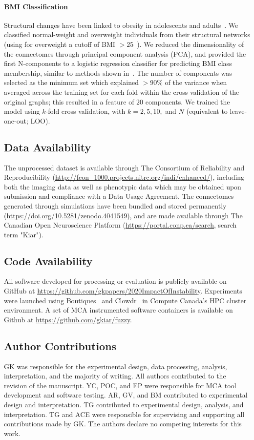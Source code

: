 \documentclass[fleqn,10pt]{SelfArx} %
\begin{document}
\paragraph{BMI Classification} Structural changes have been linked to obesity in adolescents and
adults~\cite{Raji2010-lh}. We classified normal-weight and overweight individuals from their structural networks (using
for overweight a cutoff of BMI $> 25$~\cite{Gupta2015-ap}). We reduced the dimensionality of the connectomes through
principal component analysis (PCA), and provided the first N-components to a logistic regression classifier for
predicting BMI class membership, similar to methods shown in~\cite{Gupta2015-ap,Park2015-uj}. The number of components
was selected as the minimum set which explained $> 90\%$ of the variance when averaged across the training set for each
fold within the cross validation of the original graphs; this resulted in a feature of $20$ components. We trained the
model using $k$-fold cross validation, with $k = 2, 5, 10,$ and $N$ (equivalent to leave-one-out; LOO).

\subsection*{Data Availability}
The unprocessed dataset is available through The Consortium of Reliability and Reproducibility
(\url{http://fcon_1000.projects.nitrc.org/indi/enhanced/}), including both the imaging data as well as phenotypic data
which may be obtained upon submission and compliance with a Data Usage Agreement. The connectomes generated through
simulations have been bundled and stored permanently (\url{https://doi.org/10.5281/zenodo.4041549}), and are made
available through The Canadian Open Neuroscience Platform (\url{https://portal.conp.ca/search}, search term "Kiar").

\subsection*{Code Availability}
All software developed for processing or evaluation is publicly available on GitHub at
\url{https://github.com/gkpapers/2020ImpactOfInstability}. Experiments were launched using
Boutiques~\cite{Glatard2018-tu} and Clowdr~\cite{Kiar2019-sr} in Compute Canada's HPC cluster environment. A set of MCA
instrumented software containers is available on Github at \url{https://github.com/gkiar/fuzzy}. 

\subsection*{Author Contributions}
GK was responsible for the experimental design, data processing, analysis, interpretation, and the majority of writing.
All authors contributed to the revision of the manuscript. YC, POC, and EP were responsible for MCA tool development
and software testing. AR, GV, and BM contributed to experimental design and interpretation. TG contributed to
experimental design, analysis, and interpretation. TG and ACE were responsible for supervising and supporting all
contributions made by GK. The authors declare no competing interests for this work.
\end{document}
